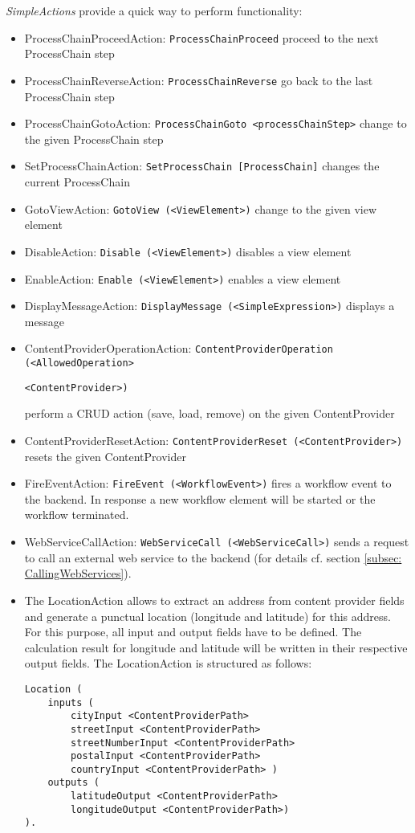 \textit{SimpleActions} provide a quick way to perform functionality:
\begin{itemize}
\item ProcessChainProceedAction: \lstinline!ProcessChainProceed!
\subitem proceed to the next ProcessChain step
\item ProcessChainReverseAction: \lstinline!ProcessChainReverse!
\subitem go back to the last ProcessChain step
\item ProcessChainGotoAction: \lstinline!ProcessChainGoto <processChainStep>!
\subitem change to the given ProcessChain step
\item SetProcessChainAction: \lstinline!SetProcessChain [ProcessChain]!
\subitem changes the current ProcessChain
\item GotoViewAction: \lstinline!GotoView (<ViewElement>)!
\subitem change to the given view element
\item DisableAction: \lstinline!Disable (<ViewElement>)!
\subitem disables a view element
\item EnableAction: \lstinline!Enable (<ViewElement>)!
\subitem enables a view element
\item DisplayMessageAction: \lstinline!DisplayMessage (<SimpleExpression>)!
\subitem displays a message
\item {ContentProviderOperationAction: \lstinline!ContentProviderOperation (<AllowedOperation>!

 \lstinline!<ContentProvider>)!}
\subitem perform a CRUD action (save, load, remove) on the given ContentProvider
\item ContentProviderResetAction: \lstinline!ContentProviderReset (<ContentProvider>)!
\subitem resets the given ContentProvider
\item FireEventAction: \lstinline!FireEvent (<WorkflowEvent>)!
\subitem fires a workflow event to the backend. In response a new workflow element will be started or the workflow terminated.

\item WebServiceCallAction: \lstinline!WebServiceCall (<WebServiceCall>)!
\subitem sends a request to call an external web service to the backend (for details cf. section \ref{subsec: CallingWebServices}).

\item The LocationAction allows to extract an address from content provider fields and generate a punctual location (\ie longitude and latitude) for this address. For this purpose, all input and output fields have to be defined. The calculation result for longitude and latitude will be written in their respective output fields. The LocationAction is structured as follows:

\begin{lstlisting}
Location (
	inputs (
		cityInput <ContentProviderPath>
		streetInput <ContentProviderPath>
		streetNumberInput <ContentProviderPath>
		postalInput <ContentProviderPath>
		countryInput <ContentProviderPath> )
	outputs (
		latitudeOutput <ContentProviderPath>
		longitudeOutput <ContentProviderPath>)
).
\end{lstlisting}

 
\end{itemize}

